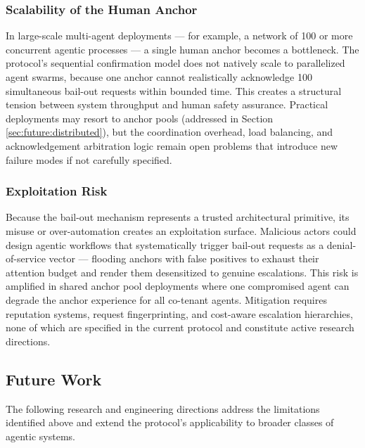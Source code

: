 \subsubsection{Scalability of the Human Anchor}
\label{sec:limitations:scalability}
In large-scale multi-agent deployments — for example, a network of 100 or more
concurrent agentic processes — a single human anchor becomes a bottleneck.
The protocol's sequential confirmation model does not natively scale to
parallelized agent swarms, because one anchor cannot realistically acknowledge
100 simultaneous bail-out requests within bounded time. This creates a
structural tension between system throughput and human safety assurance.
Practical deployments may resort to anchor pools (addressed in Section
\ref{sec:future:distributed}), but the coordination overhead, load balancing,
and acknowledgement arbitration logic remain open problems that introduce
new failure modes if not carefully specified.

\subsubsection{Exploitation Risk}
\label{sec:limitations:exploitation}
Because the bail-out mechanism represents a trusted architectural primitive,
its misuse or over-automation creates an exploitation surface. Malicious actors
could design agentic workflows that systematically trigger bail-out requests
as a denial-of-service vector — flooding anchors with false positives to exhaust
their attention budget and render them desensitized to genuine escalations. This
risk is amplified in shared anchor pool deployments where one compromised agent
can degrade the anchor experience for all co-tenant agents. Mitigation requires
reputation systems, request fingerprinting, and cost-aware escalation hierarchies,
none of which are specified in the current protocol and constitute active
research directions.

\subsection{Future Work}
\label{sec:future}

The following research and engineering directions address the limitations
identified above and extend the protocol's applicability to broader classes of
agentic systems.

